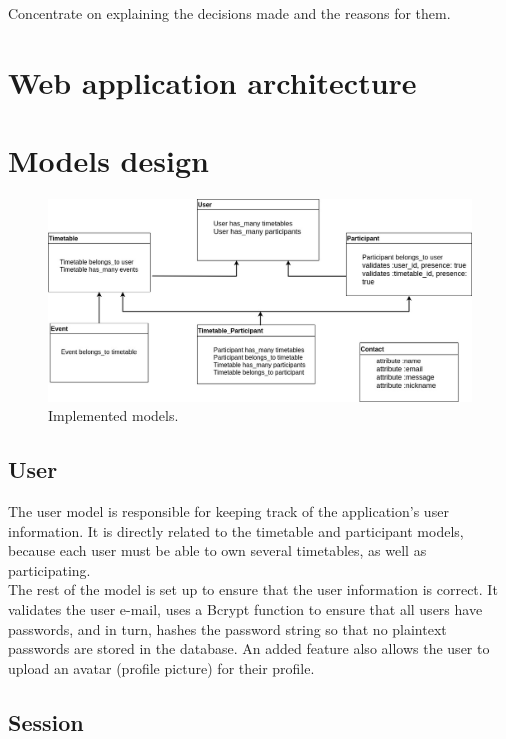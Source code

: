 Concentrate on explaining the decisions made and the reasons for them.
\section{Web application architecture}
\vspace{-5mm}
\section{Models design}
\vspace{-5mm}
\begin{figure}[H]
	\centering
    \includegraphics[trim={0 0 0 0},clip,width=1\textwidth]{Files/Models.jpg}
    \caption{Implemented models.}
    \label{fig: Models}
\end{figure}
\cite{draw:io}
\subsection{User}
\vspace{-5mm}
The user model is responsible for keeping track of the application's user information. It is directly related to the timetable and participant models, because each user must be able to own several timetables, as well as participating.\\ 
The rest of the model is set up to ensure that the user information is correct. It validates the user e-mail, uses a Bcrypt function to ensure that all users have passwords, and in turn, hashes the password string so that no plaintext passwords are stored in the database. An added feature also allows the user to upload an avatar (profile picture) for their profile. \cite{wiki:RoR}

\subsection{Session}
\vspace{-5mm}
